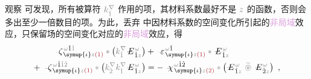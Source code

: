 观察  可发现，所有被算符 $\mathcolor{gray}{k^\nabla_{\check{1}}}$ 作用的项，其材料系数最好不是 $\mathcolor{gray}{z}$ 的函数，否则会多出至少一倍数目的项。为此，丢弃  中因材料系数的空间变化所引起的\textcolor{Plum}{非局域}效应，只保留场的空间变化对应的\textcolor{Plum}{非局域}效应，得
\begin{subequations}
	\abovedisplayskip=-8pt
\begin{align}
	\xint{\begin{smallmatrix} ~ \\ {}^{}_{\mathcolor{gray}{-}} \\ ~ \end{smallmatrix}}{12}{\zeta}^{\;\! \mathcolor{gray}{\omega} \hat{1} \mathcolor{gray}{\check{1}}}_{\;\! \symup{\iota} \mathcolor{gray}{z} \textcolor{Maroon}{(1)}} \mathcolor{gray}{*} \left( \mathcolor{gray}{k^\nabla_{\check{1}}} \xint{\mathcolor{gray}{-}}{295}{E}^{\;\!\mathcolor{gray}{\omega}}_{\;\! \hat{1} \mathcolor{gray}{z}} \right) &+ \xint{\begin{smallmatrix} ~ \\ {}^{}_{\mathcolor{gray}{-}} \\ ~ \end{smallmatrix}}{16}{\varepsilon}^{\;\! \mathcolor{gray}{\omega} \hat{1}}_{\;\! \symup{\iota} \mathcolor{gray}{z} \textcolor{Maroon}{(1)}} \mathcolor{gray}{*} \xint{\mathcolor{gray}{-}}{295}{E}^{\;\!\mathcolor{gray}{\omega}}_{\;\! \hat{1} \mathcolor{gray}{z}}  \label{eq:nonlinear(2)-wave_wkrho-simplify3} \\ 
	+~ \xint{\begin{smallmatrix} ~ \\ {}^{}_{\mathcolor{gray}{-}} \\ ~ \end{smallmatrix}}{12}{\zeta}^{\;\! \mathcolor{gray}{\omega} \hat{1} \mathcolor{gray}{\check{1} \check{2}}}_{\;\! \symup{\iota} \mathcolor{gray}{z} \textcolor{Maroon}{(1)}} \mathcolor{gray}{*} \left( \mathcolor{gray}{k^\nabla_{\check{2}}} \mathcolor{gray}{k^\nabla_{\check{1}}} \xint{\mathcolor{gray}{-}}{295}{E}^{\;\!\mathcolor{gray}{\omega}}_{\;\! \hat{1} \mathcolor{gray}{z}} \right) &= - ~\xint{{}^{}_{\mathcolor{gray}{-}}}{23}{\chi}^{\;\! \mathcolor{gray}{\omega} \hat{1} \hat{2}}_{\;\! \symup{\iota} \mathcolor{gray}{z} \textcolor{Maroon}{(2)}} \mathcolor{gray}{*} \left( \xint{\mathcolor{gray}{-}}{295}{E}^{\;\!\mathcolor{gray}{\omega}}_{\;\! \hat{1} \mathcolor{gray}{z}} ~\mathcolor{gray}{\widetilde \circledast}~ \xint{\mathcolor{gray}{-}}{295}{E}^{\;\!\mathcolor{gray}{\omega}}_{\;\! \hat{2} \mathcolor{gray}{z}} \right)~, \label{eq:nonlinear(2)-wave_wkrho-simplify3-2}
\end{align}
\end{subequations}
